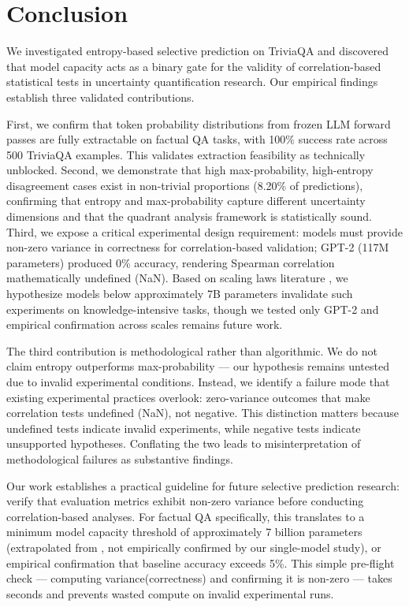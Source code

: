 \section{Conclusion}

We investigated entropy-based selective prediction on TriviaQA and discovered that model capacity acts as a binary gate for the validity of correlation-based statistical tests in uncertainty quantification research. Our empirical findings establish three validated contributions.

First, we confirm that token probability distributions from frozen LLM forward passes are fully extractable on factual QA tasks, with 100\% success rate across 500 TriviaQA examples. This validates extraction feasibility as technically unblocked. Second, we demonstrate that high max-probability, high-entropy disagreement cases exist in non-trivial proportions (8.20\% of predictions), confirming that entropy and max-probability capture different uncertainty dimensions and that the quadrant analysis framework is statistically sound. Third, we expose a critical experimental design requirement: models must provide non-zero variance in correctness for correlation-based validation; GPT-2 (117M parameters) produced 0\% accuracy, rendering Spearman correlation mathematically undefined (NaN). Based on scaling laws literature \citep{Roberts2020}, we hypothesize models below approximately 7B parameters invalidate such experiments on knowledge-intensive tasks, though we tested only GPT-2 and empirical confirmation across scales remains future work.

The third contribution is methodological rather than algorithmic. We do not claim entropy outperforms max-probability --- our hypothesis remains untested due to invalid experimental conditions. Instead, we identify a failure mode that existing experimental practices overlook: zero-variance outcomes that make correlation tests undefined (NaN), not negative. This distinction matters because undefined tests indicate invalid experiments, while negative tests indicate unsupported hypotheses. Conflating the two leads to misinterpretation of methodological failures as substantive findings.

Our work establishes a practical guideline for future selective prediction research: verify that evaluation metrics exhibit non-zero variance before conducting correlation-based analyses. For factual QA specifically, this translates to a minimum model capacity threshold of approximately 7 billion parameters (extrapolated from \citet{Roberts2020}, not empirically confirmed by our single-model study), or empirical confirmation that baseline accuracy exceeds 5\%. This simple pre-flight check --- computing variance(correctness) and confirming it is non-zero --- takes seconds and prevents wasted compute on invalid experimental runs.


